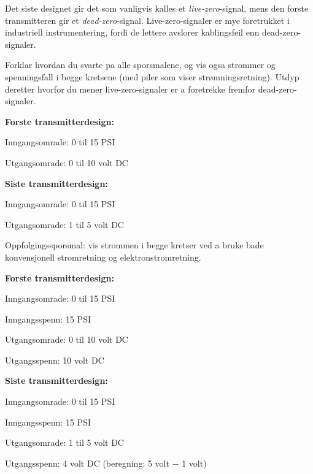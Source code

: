 Det siste designet gir det som vanligvis kalles et {\it live-zero}-signal, mens den forste transmitteren gir et {\it dead-zero}-signal.  Live-zero-signaler er mye foretrukket i industriell instrumentering, fordi de lettere avslorer kablingsfeil enn dead-zero-signaler.

\vskip 10pt

Forklar hvordan du svarte pa alle sporsmalene, og vis ogsa strommer og spenningsfall i begge kretsene (med piler som viser strømningsretning).  Utdyp deretter hvorfor du mener live-zero-signaler er a foretrekke fremfor dead-zero-signaler.







\noindent
{\bf Forste transmitterdesign:}

Inngangsomrade: 0 til 15 PSI

Utgangsomrade: 0 til 10 volt DC

\vskip 10pt

\noindent
{\bf Siste transmitterdesign:}

Inngangsomrade: 0 til 15 PSI

Utgangsomrade: 1 til 5 volt DC

\vskip 10pt

Oppfolgingssporsmal: vis strommen i begge kretser ved a bruke bade konvensjonell stromretning og elektronstromretning.







\noindent
{\bf Forste transmitterdesign:}

Inngangsomrade: 0 til 15 PSI

Inngangsspenn: 15 PSI

Utgangsomrade: 0 til 10 volt DC

Utgangsspenn: 10 volt DC

\vskip 10pt

\noindent
{\bf Siste transmitterdesign:}

Inngangsomrade: 0 til 15 PSI

Inngangsspenn: 15 PSI

Utgangsomrade: 1 til 5 volt DC

Utgangsspenn: 4 volt DC (beregning: 5 volt $-$ 1 volt)

\vskip 10pt

